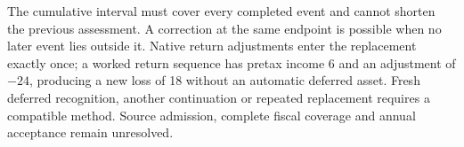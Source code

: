 The cumulative interval must cover every completed event and cannot shorten the
previous assessment. A correction at the same endpoint is possible when no later
event lies outside it. Native return adjustments enter the replacement exactly
once; a worked return sequence has pretax income 6 and an adjustment of $-24$,
producing a new loss of 18 without an automatic deferred asset. Fresh deferred
recognition, another continuation or repeated replacement requires a compatible
method. Source admission, complete fiscal coverage and annual acceptance remain
unresolved.
